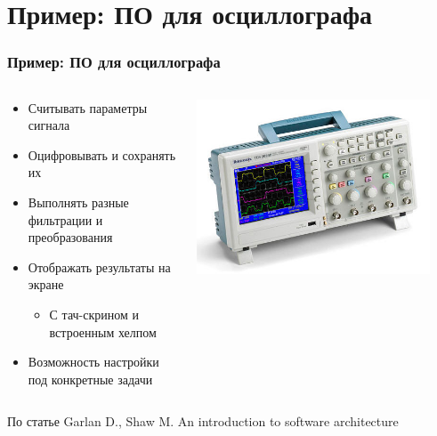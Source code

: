 \documentclass[xetex,mathserif,serif]{beamer}
\begin{document}
    \section{Пример: ПО для осциллографа}

    \begin{frame}
        \frametitle{Пример: ПО для осциллографа}
        \begin{columns}
            \begin{column}{0.6\textwidth}
                \begin{itemize}
                    \item Считывать параметры сигнала
                    \item Оцифровывать и сохранять их
                    \item Выполнять разные фильтрации и преобразования
                    \item Отображать результаты на экране
                    \begin{itemize}
                        \item С тач-скрином и встроенным хелпом
                    \end{itemize}
                    \item Возможность настройки под конкретные задачи
                \end{itemize}
            \end{column}
            \begin{column}{0.4\textwidth}
                \begin{center}
                    \includegraphics[width=0.9\textwidth]{oscilloscope.png}
                \end{center}
            \end{column}
        \end{columns}
        \vspace{1cm}
        \begin{tiny}
            По статье Garlan D., Shaw M. An introduction to software architecture
        \end{tiny}
    \end{frame}
\end{document}
